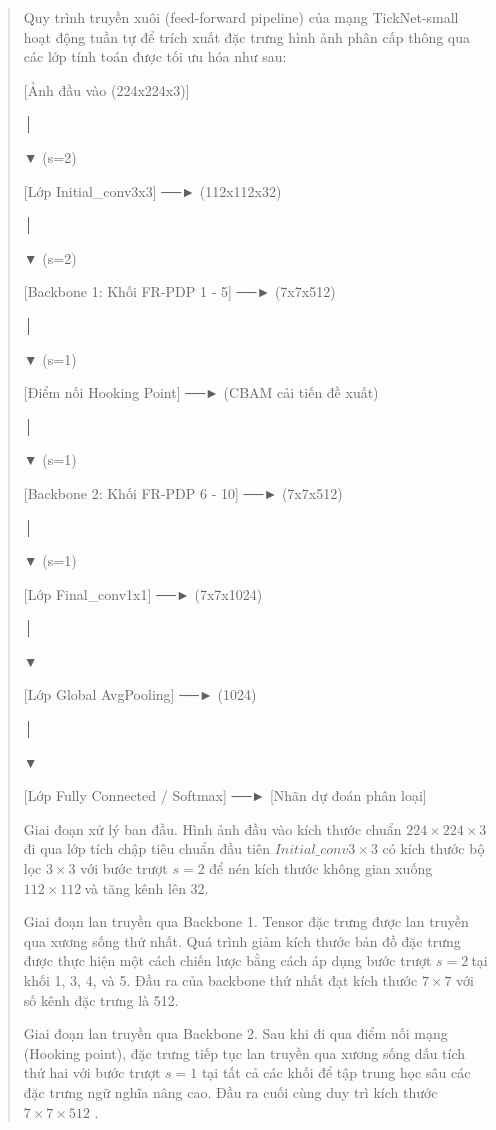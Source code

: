 \documentclass[
]{article}
\begin{document}
\begin{quote}
Quy trình truyền xuôi (feed-forward pipeline) của mạng TickNet-small
hoạt động tuần tự để trích xuất đặc trưng hình ảnh phân cấp thông qua
các lớp tính toán được tối ưu hóa như sau:

{[}Ảnh đầu vào (224x224x3){]}

│

▼ (s=2)

{[}Lớp Initial\_conv3x3{]} ──► (112x112x32)

│

▼ (s=2)

{[}Backbone 1: Khối FR-PDP 1 - 5{]} ──► (7x7x512)

│

▼ (s=1)

{[}Điểm nối Hooking Point{]} ──► (CBAM cải tiến đề xuất)

│

▼ (s=1)

{[}Backbone 2: Khối FR-PDP 6 - 10{]} ──► (7x7x512)

│

▼ (s=1)

{[}Lớp Final\_conv1x1{]} ──► (7x7x1024)

│

▼

{[}Lớp Global AvgPooling{]} ──► (1024)

│

▼

{[}Lớp Fully Connected / Softmax{]} ──► {[}Nhãn dự đoán phân loại{]}

Giai đoạn xử lý ban đầu. Hình ảnh đầu vào kích thước chuẩn
\(224 \times 224 \times 3\) đi qua lớp tích chập tiêu chuẩn đầu tiên
\(Initial\_ conv3 \times 3\) có kích thước bộ lọc \(3 \times 3\) với
bước trượt \(s = 2\) để nén kích thước không gian xuống
\(112 \times 112\ \)và tăng kênh lên 32.

Giai đoạn lan truyền qua Backbone 1. Tensor đặc trưng được lan truyền
qua xương sống thứ nhất. Quá trình giảm kích thước bản đồ đặc trưng được
thực hiện một cách chiến lược bằng cách áp dụng bước trượt
\(s = 2\ \)tại khối 1, 3, 4, và 5. Đầu ra của backbone thứ nhất đạt kích
thước \(7 \times 7\) với số kênh đặc trưng là 512.

Giai đoạn lan truyền qua Backbone 2. Sau khi đi qua điểm nối mạng
(Hooking point), đặc trưng tiếp tục lan truyền qua xương sống dấu tích
thứ hai với bước trượt \(s = 1\) tại tất cả các khối để tập trung học
sâu các đặc trưng ngữ nghĩa nâng cao. Đầu ra cuối cùng duy trì kích
thước \(7 \times 7 \times 512\) .


\end{quote}
\end{document}
